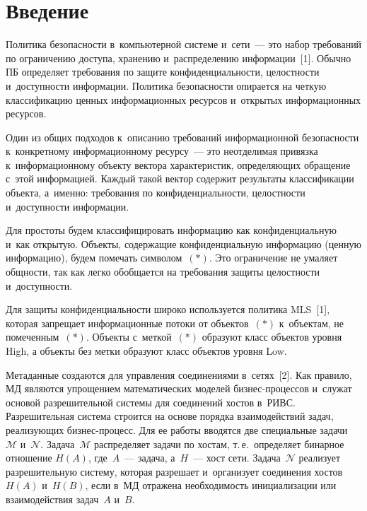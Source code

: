   
  



\thispagestyle{headings}

\begin{multicols}{2}

\label{st\stat}

\section{Введение}

  Политика безопасности в~компьютерной системе и~сети~--- это набор 
требований по ограничению доступа, хранению и~распределению 
информации~[1]. Обычно ПБ определяет требования по защите 
конфиденциальности, целостности и~доступности информации. Политика
безопас\-ности опирается на 
четкую классификацию ценных информационных ресурсов и~открытых 
информационных ресурсов. 
  
  Один из общих подходов к~описанию требований информационной 
безопасности к~конкретному информационному ресурсу~--- это неотделимая 
привязка к~информационному объекту вектора характеристик, определяющих 
обращение с~этой информацией. Каждый такой вектор содержит результаты 
классификации объекта, а~именно: требования по конфиденциальности, 
целостности и~доступности информации. 
  
  Для простоты будем классифицировать информацию как конфиденциальную 
  и~как открытую. Объекты, содержащие конфиденциальную информацию (ценную 
информацию), будем помечать символом~$(*)$. Это ограничение не умаляет 
общности, так как легко обобщается на требования защиты целостности 
и~доступности. 
  
  Для защиты конфиденциальности широко используется политика 
  MLS~[1], которая запрещает информационные потоки от 
объектов~$(*)$ к~объектам, не помеченным~$(*)$. Объекты с~меткой~$(*)$ 
образуют класс объектов уровня High, а объекты без метки образуют класс 
объектов уровня Low. 
  
  Метаданные создаются для управления соединениями в~сетях~[2]. Как 
правило, МД являются упрощением математических моделей  
биз\-нес-про\-цес\-сов и~служат основой разрешительной системы для соединений 
хостов в~РИВС. Разрешительная система строится на основе порядка взаимодействий 
задач, реализующих бизнес-процесс. Для ее работы вводятся две специальные 
задачи~$\mathcal{M}$ и~$\mathcal{N}$. Задача~$\mathcal{M}$ распределяет 
задачи по хостам, т.\,е.\ определяет бинарное отношение $H(A)$, где~$A$~--- 
задача, а~$H$~--- хост сети. Задача~$\mathcal{N}$ реализует разрешительную 
систему, которая разрешает и~организует соединения хостов $H(A)$ и~$H(B)$, 
если в~МД отражена необходимость инициализации или взаимодействия 
задач~$A$ и~$B$. 
  

\end{multicols}
